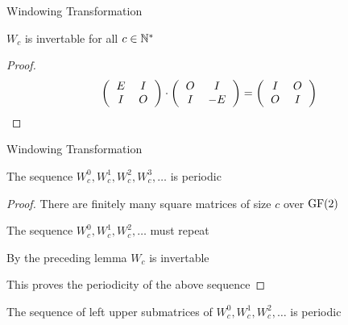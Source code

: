 \begin{frame}{Windowing Transformation}
	\begin{lemma}
		$W_{c}$ is invertable for all $c \in \mathbb{N}^{*}$
	\end{lemma}
	
	\pause
	\bigskip
	
	\begin{proof}
		\[
			\left(
			\begin{tabular}{cc}
				$E$ & $I$ \\
				$I$ & $O$ \\
			\end{tabular}
			\right)
			\cdot
			\left(
			\begin{tabular}{cc}
				$O$ & $I$ \\
				$I$ & $-E$ \\
			\end{tabular}
			\right)
			=
			\left(
			\begin{tabular}{cc}
				$I$ & $O$ \\
				$O$ & $I$ \\
			\end{tabular}			
			\right)
		\]
	\end{proof}
\end{frame}

\begin{frame}{Windowing Transformation}
	\begin{theorem}
		The sequence $W_{c}^{0}, W_{c}^{1}, W_{c}^{2}, W_{c}^{3}, \ldots$ is periodic
	\end{theorem}
	
	\pause
	\bigskip
	
	\begin{proof}
		There are finitely many square matrices of size $c$ over $\operatorname{GF}(2)$
		
		The sequence $W_{c}^{0}, W_{c}^{1}, W_{c}^{2},\ldots$ must repeat
		
		By the preceding lemma $W_{c}$ is invertable
		
		This proves the periodicity of the above sequence
	\end{proof}
	
	\pause
	\bigskip
	
	\begin{corollary}
		The sequence of left upper submatrices of 
		$W_{c}^{0}, W_{c}^{1}, W_{c}^{2},\ldots$ is periodic
	\end{corollary}
\end{frame}
